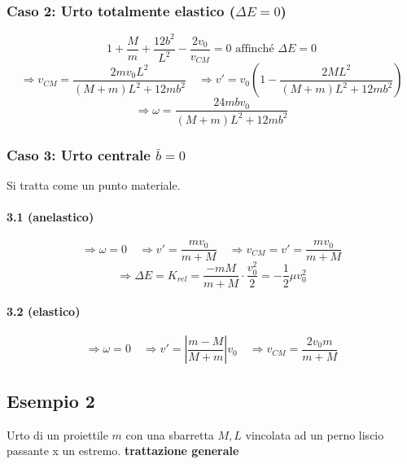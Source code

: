 \subsubsection*{Caso 2: Urto totalmente elastico ($\Delta E = 0$)}

\begin{figure}[H]
\raggedleft
{}
\end{figure}

$$ 1 + \frac{M}{m} + \frac{12 b^2}{L^2} - \frac{2 v_0}{v_{CM}} = 0 \text{ affinché } \Delta E = 0 $$
$$ \Rightarrow v_{CM} = \frac{2 m v_0 L^2}{(M+m)L^2 + 12mb^2} \quad \Rightarrow v' = v_0 \left( 1 - \frac{2 M L^2}{(M+m)L^2 + 12mb^2} \right) $$
$$ \Rightarrow \omega = \frac{24 m b v_0}{(M+m)L^2 + 12mb^2} $$

\subsubsection*{Caso 3: Urto centrale $\bar{b} = 0$}
Si tratta come un punto materiale.
\paragraph*{3.1 (anelastico)}
$$ \Rightarrow \omega = 0 \quad \Rightarrow v' = \frac{m v_0}{m+M} \quad \Rightarrow v_{CM} = v' = \frac{m v_0}{m+M} $$
$$ \Rightarrow \Delta E = K_{rel} = \frac{-m M}{m+M} \cdot \frac{v_0^2}{2} = - \frac{1}{2} \mu v_0^2 $$

\paragraph*{3.2 (elastico)}
$$ \Rightarrow \omega = 0 \quad \Rightarrow v' = \left| \frac{m-M}{M+m} \right| v_0 \quad \Rightarrow v_{CM} = \frac{2 v_0 m}{m+M} $$

\subsection*{Esempio 2}
Urto di un proiettile $m$ con una sbarretta $M, L$ vincolata ad un perno liscio passante x un estremo. \textbf{trattazione generale}

